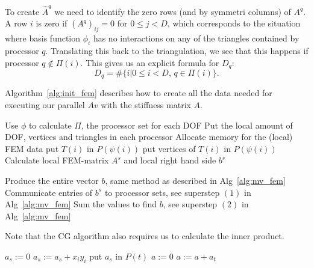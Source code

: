 \documentclass[11pt]{amsart}
\theoremstyle{definition}
\begin{document}
To create $\hat A^q$ we need to identify the zero rows (and by symmetri columns) of $A^q$. A row $i$ is zero if $(A^q)_{ij} = 0$ for $0 \leq j < D$, which corresponds to the situation where basis function $\phi_i$ has no interactions on any of the triangles contained by processor $q$. Translating this back to the triangulation, we see that this happens if processor $q \not \in \Pi(i)$. This gives us an explicit formula for $D_q$:
\[
	D_q = \#\{ i | 0 \leq i < D,\, q \in \Pi(i)\}.
\]

Algorithm~\ref{alg:init_fem} describes how to create all the data needed for executing our parallel $Av$ with the stiffness matrix $A$.
\begin{algorithm}[H]
	 {
		Use $\phi$ to calculate $\Pi$, the processor set for each DOF\; 
		Put the local amount of DOF, vertices and triangles in each processor\;
	}
	Allocate memory for the (local) FEM data\;
	 {
		 {
			put $T(i)$ in $P(\psi(i))$\;
			put vertices of $T(i)$ in $P(\psi(i))$ 
		}
	}
	Calculate local FEM-matrix $A^s$ and local right hand side $b^s$\;
	
  { Produce the entire vector $b$, same method as described in Alg~\ref{alg:mv_fem} }
	Communicate entries of $b^s$ to processor sets, see superstep $(1)$ in Alg~\ref{alg:mv_fem}\;
	Sum the values to find $b$, see superstep $(2)$ in Alg~\ref{alg:mv_fem}\;
 \caption{Algorithm that calculates the local FEM data.}
 \label{alg:init_fem}
\end{algorithm}

Note that the CG algorithm also requires us to calculate the inner product. 
\begin{algorithm}[H]
  $a_s := 0$\;
	 {
	  $a_s := a_s + x_i y_i$\;
	}
   {
		put $a_s$ in $P(t)$\;
	}
  $a := 0$\;
   {
		$a := a + a_t$\;
	}
 \caption{Inner product for vectors in FEM-system for $P(s)$}
 \label{alg:ip_fem}
\end{algorithm}
\end{document}
